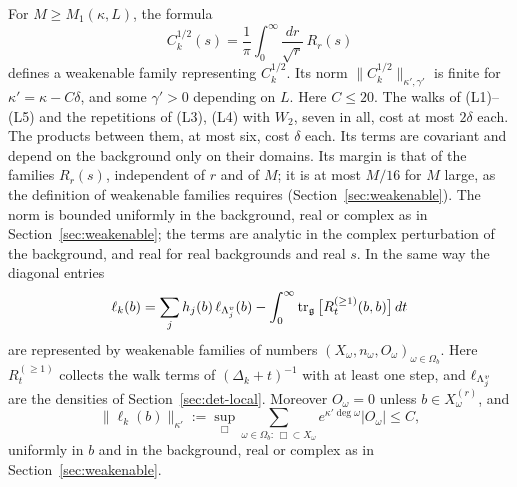 \begin{corollary}\label{cor:weak-covariance}
For $M\ge M_1(\kappa,L)$, the formula
\[
C_k^{1/2}(s)=\frac1\pi\int_0^\infty\frac{dr}{\sqrt r}\,R_r(s)
\]
defines a weakenable family representing $C_k^{1/2}$. Its norm $\|C_k^{1/2}\|_{\kappa',\gamma'}$ is finite for $\kappa'=\kappa-C\delta$, and some $\gamma'>0$ depending on $L$. Here $C\le20$. The walks of (L1)--(L5) and the repetitions of (L3), (L4) with $W_2$, seven in all, cost at most $2\delta$ each. The products between them, at most six, cost $\delta$ each. Its terms are covariant and depend on the background only on their domains. Its margin is that of the families $R_r(s)$, independent of $r$ and of $M$; it is at most $M/16$ for $M$ large, as the definition of weakenable families requires (Section~\ref{sec:weakenable}). The norm is bounded uniformly in the background, real or complex as in Section~\ref{sec:weakenable}; the terms are analytic in the complex perturbation of the background, and real for real backgrounds and real $s$. In the same way the diagonal entries
\[
\ell_k(b)=\sum_jh_j(b)\,\ell_{\Lambda^v_j}(b)-\int_0^\infty\operatorname{tr}_{\mathfrak g}\big[R^{(\ge1)}_t(b,b)\big]\,dt
\]
are represented by weakenable families of numbers $(X_\omega,n_\omega,O_\omega)_{\omega\in\Omega_b}$. Here $R^{(\ge1)}_t$ collects the walk terms of $(\Delta_k+t)^{-1}$ with at least one step, and $\ell_{\Lambda^v_j}$ are the densities of Section~\ref{sec:det-local}. Moreover $O_\omega=0$ unless $b\in X_\omega^{(r)}$, and
\[
\|\ell_k(b)\|_{\kappa'}:=\sup_\Box\sum_{\omega\in\Omega_b:\,\Box\subset X_\omega}e^{\kappa'\deg\omega}|O_\omega|\le C,
\]
uniformly in $b$ and in the background, real or complex as in Section~\ref{sec:weakenable}.
\end{corollary}

